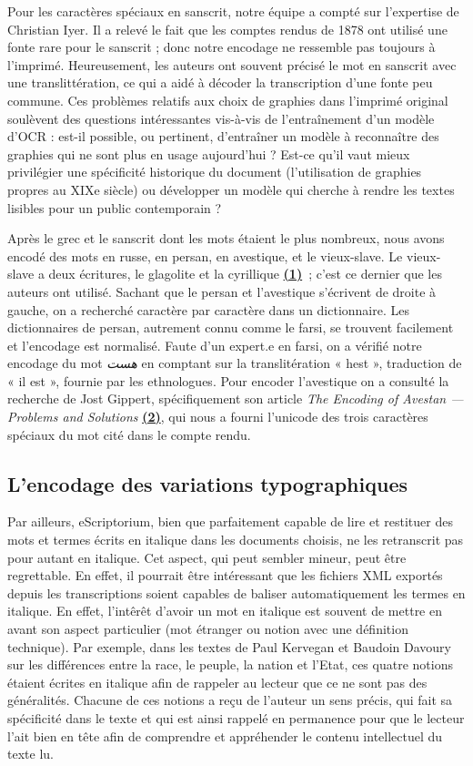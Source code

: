 \documentclass{article}
\begin{document}
	Pour les caractères spéciaux en sanscrit, notre équipe a compté sur l’expertise de Christian Iyer. Il a relevé le fait que les comptes rendus de 1878 ont utilisé une fonte rare pour le sanscrit ; donc notre encodage ne ressemble pas toujours à l’imprimé. Heureusement, les auteurs ont souvent précisé le mot en sanscrit avec une translittération, ce qui a aidé à décoder la transcription d’une fonte peu commune. Ces problèmes relatifs aux choix de graphies dans l'imprimé original soulèvent des questions intéressantes vis-à-vis de l'entraînement d'un modèle d'OCR : est-il possible, ou pertinent, d'entraîner un modèle à reconnaître des graphies qui ne sont plus en usage aujourd'hui ? Est-ce qu'il vaut mieux privilégier une spécificité historique du document (l'utilisation de graphies propres au XIXe siècle) ou développer un modèle qui cherche à rendre les textes lisibles pour un public contemporain ?
	
	Après le grec et le sanscrit dont les mots étaient le plus nombreux, nous avons encodé des mots en russe, en persan, en avestique, et le vieux-slave. Le vieux-slave a deux écritures, le glagolite et la cyrillique \underline{\textbf{(1)}}~; c'est ce dernier que les auteurs ont utilisé. Sachant que le persan et l’avestique s’écrivent de droite à gauche, on a recherché caractère par caractère dans un dictionnaire. Les dictionnaires de persan, autrement connu comme le farsi, se trouvent facilement et l’encodage est normalisé. Faute d’un expert.e en farsi, on a vérifié notre encodage du mot \textit{ هست }en comptant sur la translitération « hest », traduction de « il est », fournie par les ethnologues. Pour encoder l’avestique on a consulté la recherche de Jost Gippert, spécifiquement son article \textit{The Encoding of Avestan — Problems and Solutions} \underline{\textbf{(2)}}, qui nous a fourni l’unicode des trois caractères spéciaux du mot cité dans le compte rendu.
	
	
	\subsection{L'encodage des variations typographiques}
	
	Par ailleurs, eScriptorium, bien que parfaitement capable de lire et restituer des mots et termes écrits en italique dans les documents choisis, ne les retranscrit pas pour autant en italique. Cet aspect, qui peut sembler mineur, peut être regrettable. En effet, il pourrait être intéressant que les fichiers XML exportés depuis les transcriptions soient capables de baliser automatiquement les termes en italique. En effet, l'intêrêt d'avoir un mot en italique est souvent de mettre en avant son aspect particulier (mot étranger ou notion avec une définition technique). Par exemple, dans les textes de Paul Kervegan et Baudoin Davoury sur les différences entre la race, le peuple, la nation et l'Etat, ces quatre notions étaient écrites en italique afin de rappeler au lecteur que ce ne sont pas des généralités. Chacune de ces notions a reçu de l'auteur un sens précis, qui fait sa spécificité dans le texte et qui est ainsi rappelé en permanence pour que le lecteur l'ait bien en tête afin de comprendre et appréhender le contenu intellectuel du texte lu.
	
	\pagebreak
	\tableofcontents
\end{document}
